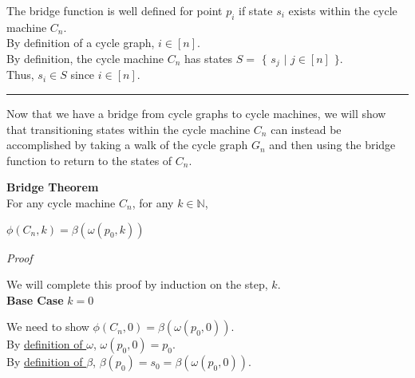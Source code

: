 \documentclass[a4paper,12pt]{article}
\begin{document}
\noindent The bridge function is well defined for point $p_i$ if state $s_i$ exists within the cycle machine $C_n$.\\

\noindent By definition of a cycle graph, $i \in [n]$.\\

\noindent By definition, the cycle machine $C_n$ has states $S =$ $\{$ $s_j$ $|$ $j \in [n]$ $\}$.\\

\noindent Thus, $s_i \in S$ since $i \in [n]$.

\begin{center}
\noindent\rule{8cm}{0.4pt}
\end{center}






\noindent Now that we have a bridge from cycle graphs to cycle machines, we will show that transitioning states within the cycle machine $C_n$ can instead be accomplished by taking a walk of the cycle graph $G_n$ and then using the bridge function to return to the states of $C_n$.\\






\label{theorem:bridge_theorem}
\hypertarget{theorem:bridge_theorem}{}
\begin{tcolorbox}
\textbf{Bridge Theorem}\\
For any cycle machine $C_n$, for any $k \in \mathbb{N}$,

\begin{center}
$\phi(C_n, k) = \beta(\omega(p_0, k))$
\end{center}

\end{tcolorbox}

\noindent
\textit{Proof}

\noindent We will complete this proof by induction on the step, $k$.\\


\noindent
\textbf{Base Case} $k = 0$

\noindent We need to show $\phi(C_n, 0) = \beta(\omega(p_0, 0))$.\\

\noindent By \hyperlink{definition:walk_functions}{definition of $\omega$}, $\omega(p_0, 0) = p_0$.\\

\noindent By \hyperlink{definition:bridge_function}{definition of $\beta$}, $\beta(p_0) = s_0 = \beta(\omega(p_0, 0))$.\\
\end{document}
